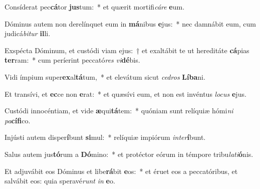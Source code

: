 \item Consíderat pec\textbf{cá}tor \textbf{jus}tum:~* et quærit mortifi\textit{cá}\textit{re} \textbf{e}um.
\item Dóminus autem non derelínquet eum in \textbf{má}nibus \textbf{e}jus:~* nec damnábit eum, cum judicá\textit{bi}\textit{tur} \textbf{il}li.
\item Exspécta Dóminum, et custódi viam ejus:~† et exaltábit te ut hereditáte \textbf{cá}pias \textbf{ter}ram:~* cum períerint peccató\textit{res} \textit{vi}\textbf{dé}bis.
\item Vidi ímpium super\textbf{ex}al\textbf{tá}tum,~* et elevátum sicut \textit{ce}\textit{dros} \textbf{Lí}\textbf{ba}ni.
\item Et transívi, et \textbf{ec}ce non \textbf{e}rat:~* et quæsívi eum, et non est invéntus \textit{lo}\textit{cus} \textbf{e}jus.
\item Custódi innocéntiam, et vide \textbf{æ}qui\textbf{tá}tem:~* quóniam sunt relíquiæ hómi\textit{ni} \textit{pa}\textbf{cí}\textbf{fi}co.
\item Injústi autem disper\textbf{í}bunt \textbf{si}mul:~* relíquiæ impiórum \textit{in}\textit{ter}\textbf{í}bunt.
\item Salus autem jus\textbf{tó}rum a \textbf{Dó}mino:~* et protéctor eórum in témpore tribu\textit{la}\textit{ti}\textbf{ó}nis.
\item Et adjuvábit eos Dóminus et libe\textbf{rá}bit \textbf{e}os:~* et éruet eos a peccatóribus, et salvábit eos: quia speravé\textit{runt} \textit{in} \textbf{e}o.
